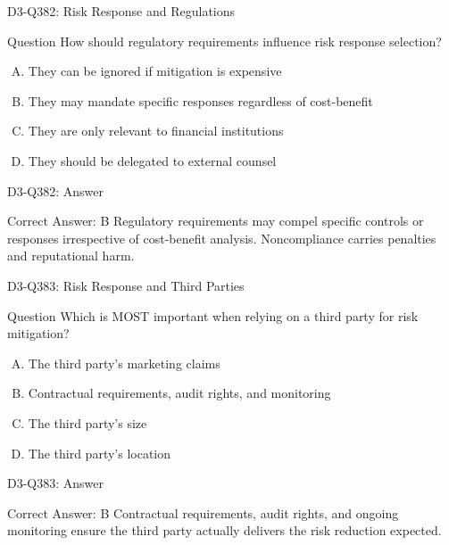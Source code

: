 \documentclass{beamer}
\begin{document}
\begin{frame}{D3-Q382: Risk Response and Regulations}
	\begin{block}{Question}
		How should regulatory requirements influence risk response selection?
	\end{block}
	\begin{enumerate}[(A)]
		\item They can be ignored if mitigation is expensive
		\item They may mandate specific responses regardless of cost-benefit
		\item They are only relevant to financial institutions
		\item They should be delegated to external counsel
	\end{enumerate}
\end{frame}
\begin{frame}{D3-Q382: Answer}
	\begin{block}{Correct Answer: B}
		Regulatory requirements may compel specific controls or responses irrespective of cost-benefit analysis. Noncompliance carries penalties and reputational harm.
	\end{block}
\end{frame}

\begin{frame}{D3-Q383: Risk Response and Third Parties}
	\begin{block}{Question}
		Which is MOST important when relying on a third party for risk mitigation?
	\end{block}
	\begin{enumerate}[(A)]
		\item The third party's marketing claims
		\item Contractual requirements, audit rights, and monitoring
		\item The third party's size
		\item The third party's location
	\end{enumerate}
\end{frame}
\begin{frame}{D3-Q383: Answer}
	\begin{block}{Correct Answer: B}
		Contractual requirements, audit rights, and ongoing monitoring ensure the third party actually delivers the risk reduction expected.
	\end{block}
\end{frame}
\end{document}
